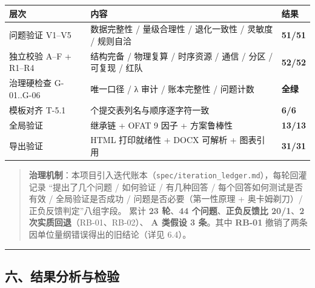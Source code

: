 \documentclass[
  10.5pt,
]{article}
\newcounter{none} %
\begin{document}
{\def\LTcaptype{none} %
\begin{longtable}[]{@{}
  >{\raggedright\arraybackslash}p{}
  >{\raggedright\arraybackslash}p{}
  >{\raggedright\arraybackslash}p{}@{}}
\toprule\noalign{}
\begin{minipage}[b]{\linewidth}\raggedright
层次
\end{minipage} & \begin{minipage}[b]{\linewidth}\raggedright
内容
\end{minipage} & \begin{minipage}[b]{\linewidth}\raggedright
结果
\end{minipage} \\
\midrule\noalign{}
\endhead
\bottomrule\noalign{}
\endlastfoot
问题验证 V1--V5 & 数据完整性 / 量级合理性 / 退化一致性 / 灵敏度 /
规则自洽 & \textbf{51/51} \\
独立校验 A--F + R1--R4 & 结构完备 / 物理复算 / 时序资源 / 通信 / 分区 /
可复现 / 红队 & \textbf{52/52} \\
治理硬检查 G-01..G-06 & 唯一口径 / λ 审计 / 账本完整性 / 问题计数 &
\textbf{全绿} \\
模板对齐 T-5.1 & 6 个提交表列名与顺序逐字符一致 & \textbf{6/6} \\
全局验证 & 继承链 + OFAT 9 因子 + 方案鲁棒性 & \textbf{13/13} \\
导出验证 & HTML 打印就绪性 + DOCX 可解析 + 图表引用 & \textbf{31/31} \\
\end{longtable}
}

\begin{quote}
\textbf{治理机制}：本项目引入迭代账本（\texttt{spec/iteration\_ledger.md}），每轮回灌记录
``提出了几个问题 / 如何验证 / 有几种回答 / 每个回答如何测试是否有效 /
全局验证是否成功 / 问题是否必要（第一性原理 + 奥卡姆剃刀）/
正负反馈判定''八组字段。 累计 \textbf{23 轮}、\textbf{44
个问题}、\textbf{正负反馈比 20/1}、\textbf{2
次实质回退}（RB-01、RB-02）、 \textbf{A 类假设 3 条}。其中
\textbf{RB-01} 撤销了两条因单位量纲错误得出的旧结论（详见 6.4）。
\end{quote}

\begin{center}\rule{0.5\linewidth}{0.5pt}\end{center}

\subsection{六、结果分析与检验}\label{ux516dux7ed3ux679cux5206ux6790ux4e0eux68c0ux9a8c}
\end{document}
